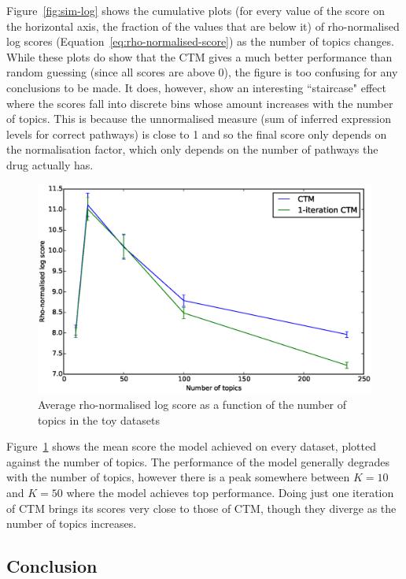 \documentclass[12pt,a4paper,twoside,openright]{report}
\begin{document}
Figure~\ref{fig:sim-log} shows the cumulative plots (for every value of the score on the horizontal axis, the fraction of the values that are below it) of rho-normalised log scores (Equation~\ref{eq:rho-normalised-score}) as the number of topics changes. While these plots do show that the CTM gives a much better performance than random guessing (since all scores are above 0), the figure is too confusing for any conclusions to be made. It does, however, show an interesting ``staircase" effect where the scores fall into discrete bins whose amount increases with the number of topics. This is because the unnormalised measure (sum of inferred expression levels for correct pathways) is close to 1 and so the final score only depends on the normalisation factor, which only depends on the number of pathways the drug actually has.

\begin{figure}[!htb]
\includegraphics[width=\textwidth]{sim-average-rho.eps}
\caption{Average rho-normalised log score as a function of the number of topics in the toy datasets}
\label{fig:sim-average-rho}
\end{figure}

Figure~\ref{fig:sim-average-rho} shows the mean score the model achieved on every dataset, plotted against the number of topics. The performance of the model generally degrades with the number of topics, however there is a peak somewhere between $K=10$ and $K=50$ where the model achieves top performance. Doing just one iteration of CTM brings its scores very close to those of CTM, though they diverge as the number of topics increases.

\subsection{Conclusion}
\end{document}

